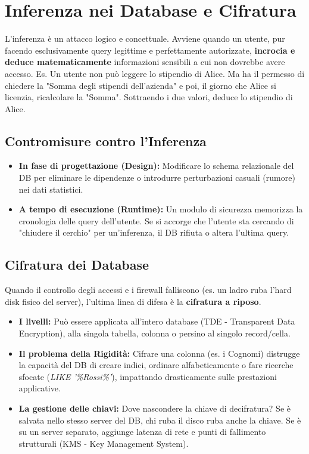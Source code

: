 \section{Inferenza nei Database e Cifratura}

\begin{defbox}
L'inferenza è un attacco logico e concettuale. Avviene quando un utente, pur facendo esclusivamente query legittime e perfettamente autorizzate, \textbf{incrocia e deduce matematicamente} informazioni sensibili a cui non dovrebbe avere accesso.
Es. Un utente non può leggere lo stipendio di Alice. Ma ha il permesso di chiedere la "Somma degli stipendi dell'azienda" e poi, il giorno che Alice si licenzia, ricalcolare la "Somma". Sottraendo i due valori, deduce lo stipendio di Alice.
\end{defbox}

\subsection{Contromisure contro l'Inferenza}
\begin{itemize}
    \item \textbf{In fase di progettazione (Design):} Modificare lo schema relazionale del DB per eliminare le dipendenze o introdurre perturbazioni casuali (rumore) nei dati statistici.
    \item \textbf{A tempo di esecuzione (Runtime):} Un modulo di sicurezza memorizza la cronologia delle query dell'utente. Se si accorge che l'utente sta cercando di "chiudere il cerchio" per un'inferenza, il DB rifiuta o altera l'ultima query.
\end{itemize}

\subsection{Cifratura dei Database}
Quando il controllo degli accessi e i firewall falliscono (es. un ladro ruba l'hard disk fisico del server), l'ultima linea di difesa è la \textbf{cifratura a riposo}. 
\begin{itemize}
    \item \textbf{I livelli:} Può essere applicata all'intero database (TDE - Transparent Data Encryption), alla singola tabella, colonna o persino al singolo record/cella.
    \item \textbf{Il problema della Rigidità:} Cifrare una colonna (es. i Cognomi) distrugge la capacità del DB di creare indici, ordinare alfabeticamente o fare ricerche sfocate (\textit{LIKE '\%Rossi\%'}), impattando drasticamente sulle prestazioni applicative.
    \item \textbf{La gestione delle chiavi:} Dove nascondere la chiave di decifratura? Se è salvata nello stesso server del DB, chi ruba il disco ruba anche la chiave. Se è su un server separato, aggiunge latenza di rete e punti di fallimento strutturali (KMS - Key Management System).
\end{itemize}
